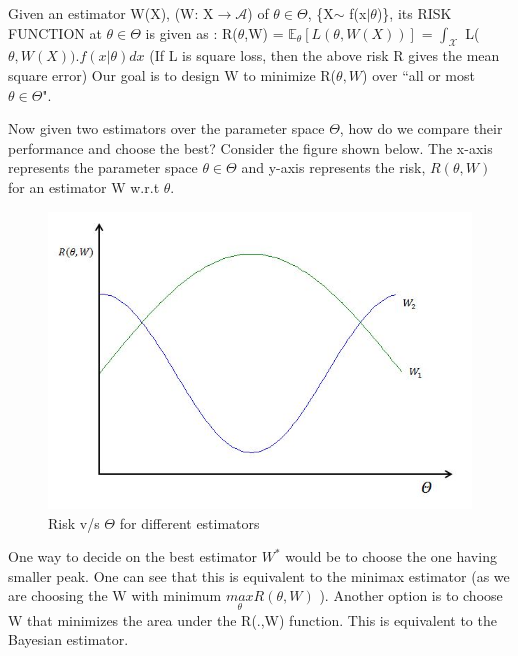 \documentclass[a4paper,english,12pt]{article}
\begin{document}
Given an estimator W(X), (W: X$\rightarrow\mathscr{A}$) of $\theta \in \Theta$, \{X$\sim$ f(x$\vert\theta$)\}, its RISK FUNCTION at $\theta \in \Theta$ is given as :
\newline\hspace*{4cm} R($\theta$,W) = $\mathbb{E}_\theta[L(\theta,W(X))]$
\newline\hspace*{55mm} = $\int_{\mathscr{X}}^{}$ L($\theta,W(X)).f(x\vert\theta)dx$
\newline (If L is square loss, then the above risk R gives the mean square error)
\newline\newline
Our goal is to design W to minimize R($\theta,W$) over \textquotedblleft all or most $\theta\in\Theta$".  

\vspace*{5mm} Now given two estimators over the parameter space $\Theta$, how do we compare their performance and choose the best?
\vspace*{3mm}\newline Consider the figure shown below. The x-axis represents the parameter space $\theta\in\Theta$ and y-axis represents the risk, $R(\theta,W)$ for an estimator W w.r.t $\theta$.
\begin{figure}[h]
	\centering
	\includegraphics[width=0.7\linewidth]{Figures/Lec21_fig1.jpg}
	\caption[rdr]{Risk v/s $\Theta$ for different estimators}
	\label{fig:Risk function}
\end{figure}
\vspace*{2mm}\newline One way to decide on the best estimator $W^*$ would be to choose the one having smaller peak. One can see that this is equivalent to the minimax estimator (as we are choosing the W with minimum $\underset{\theta}{max}R(\theta,W)$ ).
\vspace*{2mm}\newline Another option is to  choose W that minimizes the area under the R(.,W) function. This is equivalent to the Bayesian estimator.
\end{document}
